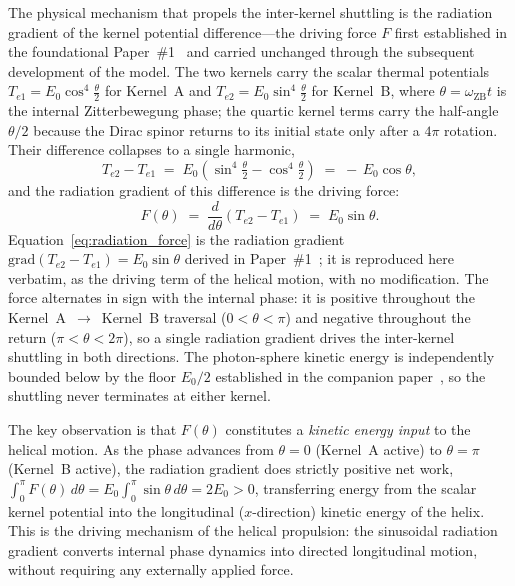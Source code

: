 \documentclass[%
 reprint, amsmath,amssymb, aps, prb, ]{revtex4-2}
\numberwithin{equation}{section}
\newcommand{\iphase}{\theta}  %
\newcommand{\omZB}{\omega_{\text{ZB}}}
\begin{document}
The physical mechanism that propels the inter-kernel shuttling is the radiation gradient of the kernel potential difference---the driving force $F$ first established in the foundational Paper~\#1~\cite{hanamura01} and carried unchanged through the subsequent development of the model. The two kernels carry the scalar thermal potentials $T_{e1} = E_0\cos^4\tfrac{\iphase}{2}$ for Kernel~A and $T_{e2} = E_0\sin^4\tfrac{\iphase}{2}$ for Kernel~B, where $\iphase = \omZB t$ is the internal Zitterbewegung phase; the quartic kernel terms carry the half-angle $\iphase/2$ because the Dirac spinor returns to its initial state only after a $4\pi$ rotation. Their difference collapses to a single harmonic,
\begin{equation}
T_{e2} - T_{e1} \;=\; E_0\!\left(\sin^4\tfrac{\iphase}{2} - \cos^4\tfrac{\iphase}{2}\right) \;=\; -\,E_0\cos\iphase,
\label{eq:kernel_difference}
\end{equation}
and the radiation gradient of this difference is the driving force:
\begin{equation}
F(\iphase) \;=\; \frac{d}{d\iphase}\!\left(T_{e2} - T_{e1}\right) \;=\; E_0\sin\iphase.
\label{eq:radiation_force}
\end{equation}
Equation~\eqref{eq:radiation_force} is the radiation gradient $\mathrm{grad}(T_{e2} - T_{e1}) = E_0\sin\iphase$ derived in Paper~\#1~\cite{hanamura01}; it is reproduced here verbatim, as the driving term of the helical motion, with no modification. The force alternates in sign with the internal phase: it is positive throughout the Kernel~A~$\to$~Kernel~B traversal ($0 < \iphase < \pi$) and negative throughout the return ($\pi < \iphase < 2\pi$), so a single radiation gradient drives the inter-kernel shuttling in both directions. The photon-sphere kinetic energy is independently bounded below by the floor $E_0/2$ established in the companion paper~\cite{hanamura46}, so the shuttling never terminates at either kernel.

The key observation is that $F(\iphase)$ constitutes a \emph{kinetic energy input} to the helical motion. As the phase advances from $\iphase=0$ (Kernel~A active) to $\iphase=\pi$ (Kernel~B active), the radiation gradient does strictly positive net work, $\int_0^{\pi} F(\iphase)\,d\iphase = E_0\int_0^{\pi}\sin\iphase\,d\iphase = 2E_0 > 0$, transferring energy from the scalar kernel potential into the longitudinal ($x$-direction) kinetic energy of the helix. This is the driving mechanism of the helical propulsion: the sinusoidal radiation gradient converts internal phase dynamics into directed longitudinal motion, without requiring any externally applied force.
\end{document}
